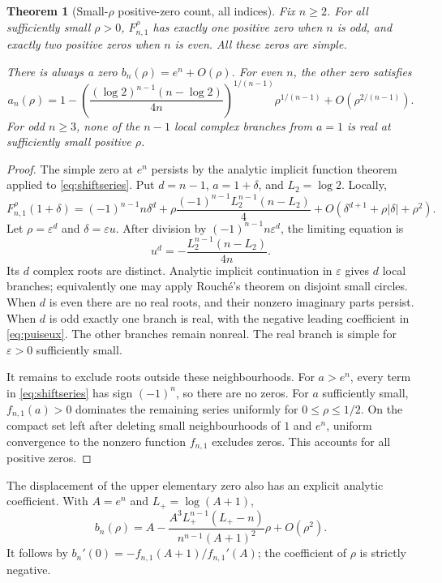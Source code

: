 \documentclass[11pt]{article}
\numberwithin{equation}{section}
\newtheorem{theorem}{Theorem}[section]
\theoremstyle{definition}\newtheorem{definition}[theorem]{Definition}
\theoremstyle{remark}\newtheorem{remark}[theorem]{Remark}
\begin{document}
\begin{theorem}[Small-$\rho$ positive-zero count, all indices]\label{thm:smallrho}
Fix $n\geq2$. For all sufficiently small $\rho>0$, $F_{n,1}^{\rho}$ has exactly one positive zero when $n$ is odd, and exactly two positive zeros when $n$ is even. All these zeros are simple.

There is always a zero $b_n(\rho)=e^n+O(\rho)$. For even $n$, the other zero satisfies
\begin{equation}\label{eq:puiseux}
a_n(\rho)=1-\left(\frac{(\log2)^{n-1}(n-\log2)}{4n}\right)^{1/(n-1)}\rho^{1/(n-1)}
+O\!\left(\rho^{2/(n-1)}\right).
\end{equation}
For odd $n\geq3$, none of the $n-1$ local complex branches from $a=1$ is real at sufficiently small positive $\rho$.
\end{theorem}
\begin{proof}
The simple zero at $e^n$ persists by the analytic implicit function theorem applied to \eqref{eq:shiftseries}. Put $d=n-1$, $a=1+\delta$, and $L_2=\log2$. Locally,
\[
F_{n,1}^{\rho}(1+\delta)
=(-1)^{n-1}n\delta^d
+\rho\frac{(-1)^{n-1}L_2^{n-1}(n-L_2)}4
+O(\delta^{d+1}+\rho|\delta|+\rho^2).
\]
Let $\rho=\varepsilon^d$ and $\delta=\varepsilon u$. After division by $(-1)^{n-1}n\varepsilon^d$, the limiting equation is
\[
u^d=-\frac{L_2^{n-1}(n-L_2)}{4n}.
\]
Its $d$ complex roots are distinct. Analytic implicit continuation in $\varepsilon$ gives $d$ local branches; equivalently one may apply Rouch\'e's theorem on disjoint small circles. When $d$ is even there are no real roots, and their nonzero imaginary parts persist. When $d$ is odd exactly one branch is real, with the negative leading coefficient in \eqref{eq:puiseux}. The other branches remain nonreal. The real branch is simple for $\varepsilon>0$ sufficiently small.

It remains to exclude roots outside these neighbourhoods. For $a>e^n$, every term in \eqref{eq:shiftseries} has sign $(-1)^n$, so there are no zeros. For $a$ sufficiently small, $f_{n,1}(a)>0$ dominates the remaining series uniformly for $0\leq\rho\leq1/2$. On the compact set left after deleting small neighbourhoods of $1$ and $e^n$, uniform convergence to the nonzero function $f_{n,1}$ excludes zeros. This accounts for all positive zeros.
\end{proof}

The displacement of the upper elementary zero also has an explicit analytic coefficient. With $A=e^n$ and $L_+=\log(A+1)$,
\begin{equation}\label{eq:outer-smallrho}
b_n(\rho)=A-\frac{A^3L_+^{n-1}(L_+-n)}{n^{n-1}(A+1)^2}\rho+O(\rho^2).
\end{equation}
It follows by $b_n'(0)=-f_{n,1}(A+1)/f_{n,1}'(A)$; the coefficient of $\rho$ is strictly negative.
\end{document}
